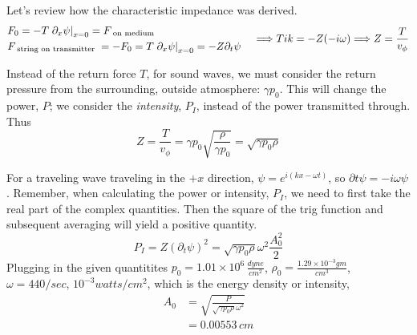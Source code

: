 \documentclass[twoside,10pt]{amsart}
\newcommand{\problemhead}[1]
  {\smallskip
   \noindent{\large\bf Problem #1.}
   \smallskip}
\begin{document}
\problemhead{8.2} Let's review how the characteristic impedance was derived.  
\[
  \begin{aligned}
    & F_0 = -T \left. \partial_x \psi \right|_{x=0} = F_{ \text{ on medium }} \\
    & F_{ \text{ string on transmitter } } = -F_0 = T \left. \partial_x \psi \right|_{x=0} = -Z \partial_t \psi
  \end{aligned}  \quad \, \Longrightarrow T i k = -Z (- i \omega )  \Longrightarrow Z = \frac{ T}{v_{\phi}} \\
\]

Instead of the return force $T$, for sound waves, we must consider the return pressure from the surrounding, outside atmosphere: $\gamma p_0$.  This will change the power, $P$; we consider the \emph{intensity}, $P_I$, instead of the power transmitted through. Thus
\[
Z = \frac{ T}{ v_{\phi}} = \gamma p_0 \sqrt{ \frac{ \rho}{ \gamma p_0 } } = \sqrt{ \gamma p_0 \rho }
\]

For a traveling wave traveling in the $+x$ direction, $\psi = e^{i(kx- \omega t) }$, so $\partial t \psi = - i\omega \psi$.  Remember, when calculating the power or intensity, $P_I$, we need to first take the real part of the complex quantities.  Then the square of the trig function and subsequent averaging will yield a positive quantity.  
\[
P_I = Z (\partial_t \psi)^2 = \sqrt{ \gamma p_0 \rho } \omega^2  \frac{ A_0^2 }{2 } 
\]
Plugging in the given quantitites $p_0 = 1.01 \times 10^6 \, \frac{dyne}{cm^2}$, $\rho_0 = \frac{ 1.29 \times 10^{-3} gm }{ cm^3}$, $\omega = 440/sec$, $10^{-3} watts/cm^2$, which is the energy density or intensity, 
\[
\begin{aligned}
  A_0 & = \sqrt{ \frac{ P }{ \sqrt{ \gamma p_0 \rho} \omega^2  } } \\
  & = \boxed{ 0.00553 \, cm}
\end{aligned}
\] 
\end{document}
